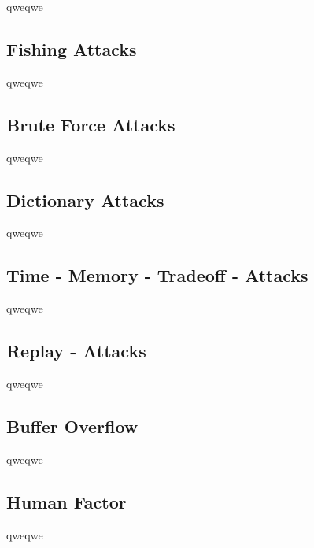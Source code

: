 qweqwe

\subsection{Fishing Attacks}

qweqwe

\subsection{Brute Force Attacks}

qweqwe

\subsection{Dictionary Attacks}

qweqwe

\subsection{Time - Memory - Tradeoff - Attacks}

qweqwe

\subsection{Replay - Attacks}

qweqwe

\subsection{Buffer Overflow}

qweqwe

\subsection{Human Factor}

qweqwe
